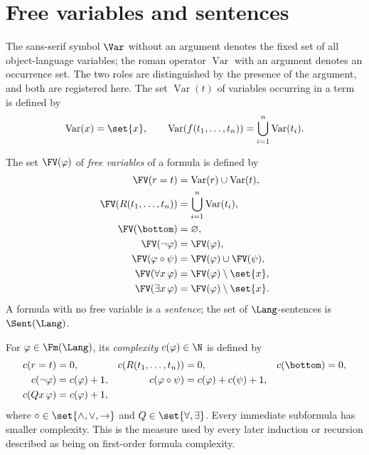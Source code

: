 \section{Free variables and sentences}
\label{sec:fol-syntax-semantics-03}

\begin{definition}
The sans-serif symbol \(\Var\) without an argument denotes the fixed set
of all object-language variables; the roman operator
\(\operatorname{Var}\) with an argument denotes an occurrence set.  The
two roles are distinguished by the presence of the argument, and both are
registered here.  The set \(\operatorname{Var}(t)\) of variables occurring
in a term is defined by
\[
 \operatorname{Var}(x)=\set{x},
 \qquad
 \operatorname{Var}(f(t_1,\ldots,t_n))
 =\bigcup_{i=1}^{n}\operatorname{Var}(t_i).
\]
\end{definition}

\begin{definition}
The set \(\FV(\varphi)\) of \emph{free variables} of a formula is defined by
\[
\begin{aligned}
 \FV(r=t)&=\operatorname{Var}(r)\cup\operatorname{Var}(t),\\
 \FV(R(t_1,\ldots,t_n))&=\bigcup_{i=1}^{n}\operatorname{Var}(t_i),\\
 \FV(\bottom)&=\varnothing,\\
 \FV(\neg\varphi)&=\FV(\varphi),\\
 \FV(\varphi\circ\psi)&=\FV(\varphi)\cup\FV(\psi),\\
 \FV(\forall x\,\varphi)&=\FV(\varphi)\setminus\set{x},\\
 \FV(\exists x\,\varphi)&=\FV(\varphi)\setminus\set{x}.
\end{aligned}
\]
A formula with no free variable is a \emph{sentence}; the set of
\(\Lang\)-sentences is \(\Sent(\Lang)\).
\end{definition}

\begin{definition}
For \(\varphi\in\Fm(\Lang)\), its \emph{complexity}
\(c(\varphi)\in\N\) is defined by
\[
\begin{aligned}
 c(r=t)&=0,&c(R(t_1,\ldots,t_n))&=0,&c(\bottom)&=0,\\
 c(\neg\varphi)&=c(\varphi)+1,
 &c(\varphi\circ\psi)&=c(\varphi)+c(\psi)+1,\\
 c(Qx\,\varphi)&=c(\varphi)+1,
\end{aligned}
\]
where \(\circ\in\set{\land,\lor,\to}\) and
\(Q\in\set{\forall,\exists}\).  Every immediate subformula has smaller
complexity.  This is the measure used by every later induction or recursion
described as being on first-order formula complexity.
\end{definition}

